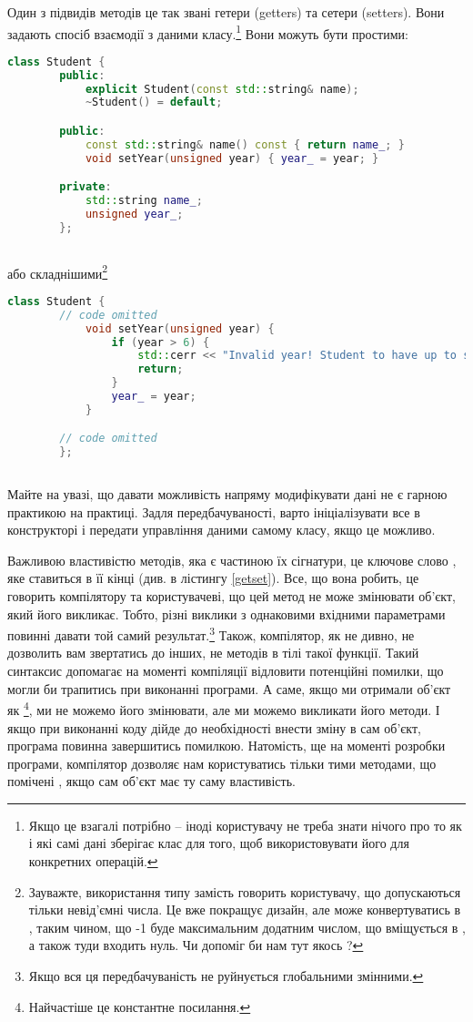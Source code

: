 \documentclass[12pt]{article}
\begin{document}
	Один з підвидів методів це так звані гетери (getters) та сетери (setters). Вони задають спосіб взаємодії з даними класу.\footnote{Якщо це взагалі потрібно -- іноді користувачу не треба знати нічого про то як і які самі дані зберігає клас для того, щоб використовувати його для конкретних операцій.} Вони можуть бути простими:
	\begin{lstlisting}[language=c++,label=getset,caption="Getters and setters"]
		class Student {
		public:
			explicit Student(const std::string& name);
			~Student() = default;

		public:
			const std::string& name() const { return name_; }
			void setYear(unsigned year) { year_ = year; }

		private:
			std::string name_;
			unsigned year_;
		};
		
	\end{lstlisting}
	або складнішими\footnote{Зауважте, використання типу  замість  говорить користувачу, що допускаються тільки невід'ємні числа. Це вже покращує дизайн, але  може конвертуватись в , таким чином, що -1 буде максимальним додатним числом, що вміщується в , а також туди входить нуль. Чи допоміг би нам тут якось ?}
	\begin{lstlisting}[language=c++]
		class Student {
		// code omitted
			void setYear(unsigned year) { 
				if (year > 6) {
					std::cerr << "Invalid year! Student to have up to six years of education!\n";
					return;
				}
				year_ = year; 
			}

		// code omitted
		};
		
	\end{lstlisting}
	
	Майте на увазі, що давати можливість напряму модифікувати дані не є гарною практикою на практиці. Задля передбачуваності, варто ініціалізувати все в конструкторі і передати управління даними самому класу, якщо це можливо.

	Важливою властивістю методів, яка є частиною їх сігнатури, це ключове слово , яке ставиться в її кінці (див.  в лістингу \ref{getset}). Все, що вона робить, це говорить компілятору та користувачеві, що цей метод не може змінювати об'єкт, який його викликає. Тобто, різні виклики з однаковими вхідними параметрами повинні давати той самий результат.\footnote{Якщо вся ця передбачуваність не руйнується глобальними змінними.} Також, компілятор, як не дивно, не дозволить вам звертатись до інших, не  методів в тілі такої функції. Такий синтаксис допомагає на моменті компіляції відловити потенційні помилки, що могли би трапитись при виконанні програми. А саме, якщо ми отримали об'єкт як \footnote{Найчастіше це константне посилання.}, ми не можемо його змінювати, але ми можемо викликати його методи. І якщо при виконанні коду дійде до необхідності внести зміну в сам об'єкт, програма повинна завершитись помилкою. Натомість, ще на моменті розробки програми, компілятор дозволяє нам користуватись тільки тими методами, що помічені , якщо сам об'єкт має ту саму властивість.
\end{document}
